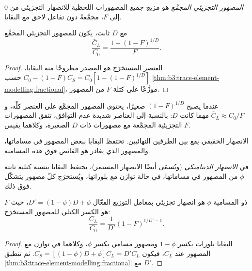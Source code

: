 \begin{definition}\label{def:b3:trace-element-modelling:fractional}
\emph{المصهور التجزيئي المجمَّع} هو
مزيج جميع المصهورات اللحظية للانصهار التجزيئي من $0$ إلى
$F$، مجمَّعةً دون تفاعل لاحق مع البقايا.
\end{definition}

\begin{proposition}
\label{prop:b3:trace-element-modelling:aggregate}
مع $D$ ثابت، يكون للمصهور التجزيئي المجمَّع
\[
\frac{\bar C_L}{C_0} = \frac{1 - (1 - F)^{1/D}}{F}.
\]
\end{proposition}

\begin{proof}
العنصر المستخرَج هو المصدر مطروحًا منه البقايا،
$C_0 - (1 - F)C_S = C_0[1 - (1 - F)^{1/D}]$ حسب \cref{thm:b3:trace-element-modelling:fractional}،
موزَّعًا على كتلة $F$ من المصهور.
\end{proof}

عندما يصبح $(1 - F)^{1/D}$ صغيرًا، يحتوي المصهور المجمَّع على العنصر كلّه،
و$\bar C_L \approx C_0/F$ مهما كانت $D$: بالنسبة إلى العناصر شديدة عدم التوافق،
تتفق المصهورات التجزيئية المجمَّعة مع مصهورات  ذات $D$ الصغيرة،
وكلاهما يقيس $F$.

الانصهار الحقيقي يقع بين الطرفين النهائيين. تحتفظ البقايا ببعض المصهور في مساماتها،
والمصهور الذي يغادر هو الفائض فوق هذه المسامية.

\begin{definition}\label{def:b3:trace-element-modelling:dynamic}
في \emph{الانصهار الديناميكي} (ويُسمّى أيضًا الانصهار
المستمر)، تحتفظ البقايا بنسبة كتلية ثابتة $\phi$ من المصهور في
مساماتها، في حالة توازن مع بلوراتها، ويُستخرَج كلّ مصهور يتشكّل
فوق ذلك.
\end{definition}

\begin{proposition}\label{prop:b3:trace-element-modelling:dynamic}
 ذو المسامية $\phi$ هو انصهار تجزيئي بمعامل التوزيع الفعّال
$D' = (1 - \phi)D + \phi$، حيث $F$ هو الكسر الكتلي
للمصهور المستخرَج:
\[
\frac{C_L}{C_0} = \frac{1}{D'}(1 - F)^{1/D' - 1}.
\]
\end{proposition}

\begin{proof}
البقايا بلورات بكسر $1 - \phi$ ومصهور مسامي بكسر
$\phi$، وكلاهما في توازن مع المصهور عند $C_L$، فيكون
$C_S = [(1 - \phi)D + \phi]C_L = D'C_L$. ثم تنطبق
\cref{thm:b3:trace-element-modelling:fractional} مع $D'$.
\end{proof}

